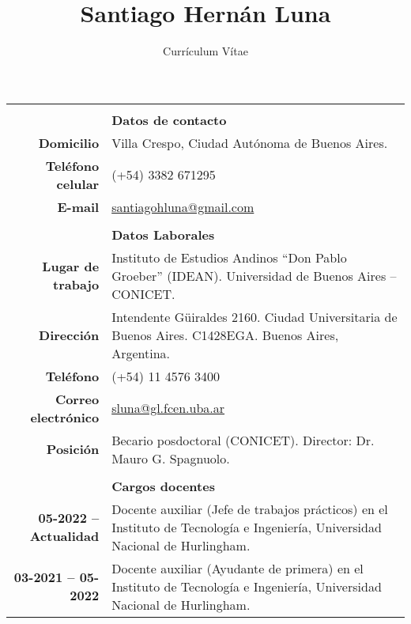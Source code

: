 \documentclass[12pt,a4paper]{article}
\title{Santiago Hernán Luna}
\author{Currículum Vítae}
\date{ }
\begin{document}
\maketitle

\begin{longtable}[t]{r p{12cm}}


        & \\
        & \textbf{Datos de contacto} \\
 \cline{2-2}
 \textbf{Domicilio}                   & Villa Crespo, Ciudad Autónoma de Buenos Aires. \\
 \textbf{Teléfono celular}            & (+54) 3382 671295 \\
 \textbf{E-mail} & \href{mailto:santiagohluna@gmail.com}{santiagohluna@gmail.com} \\

 & \\
 & \textbf{Datos Laborales} \\
\cline{2-2}
\textbf{Lugar de trabajo}   & Instituto de Estudios Andinos ``Don Pablo Groeber'' (IDEAN). Universidad de Buenos Aires -- CONICET. \\
\textbf{Dirección}   & Intendente G\"uiraldes 2160. Ciudad Universitaria de Buenos Aires. C1428EGA. Buenos Aires, Argentina. \\
\textbf{Teléfono}           & (+54) 11 4576 3400 \\
\textbf{Correo electrónico} & \href{mailto:sluna@gl.fcen.uba.ar}{sluna@gl.fcen.uba.ar} \\
\textbf{Posición}           & Becario posdoctoral (CONICET). Director: Dr. Mauro G. Spagnuolo. \\

& \\
& \textbf{Cargos docentes} \\
\cline{2-2}
\textbf{05-2022 -- Actualidad} & Docente auxiliar (Jefe de trabajos prácticos) en el Instituto de Tecnología e Ingeniería, Universidad Nacional de Hurlingham. \\
\textbf{03-2021 -- 05-2022} & Docente auxiliar (Ayudante de primera) en el Instituto de Tecnología e Ingeniería, Universidad Nacional de Hurlingham. \\


\end{longtable}
\end{document}
